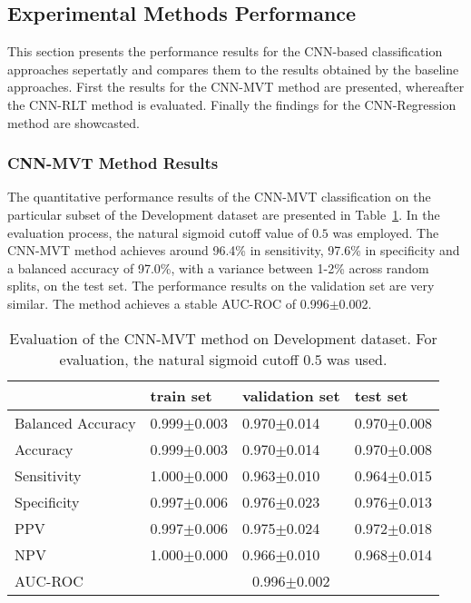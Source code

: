 \subsection{Experimental Methods Performance}
\label{subsec:exp_methods_perf}

This section presents the performance results for the CNN-based classification approaches sepertatly and compares them 
to the results obtained by the baseline approaches.
First the results for the CNN-MVT method are presented, whereafter the CNN-RLT method is evaluated.
Finally the findings for the CNN-Regression method are showcasted.

\subsubsection{CNN-MVT Method Results}
\label{subsubsec:eval_mvt}



The quantitative performance results of the CNN-MVT classification on the 
particular subset of the Development dataset are presented in Table~\ref{t1:cnn_mvt_perf_eval_table}.
In the evaluation process, the natural sigmoid cutoff value of $0.5$ was employed.
The CNN-MVT method achieves around 96.4\% in sensitivity, 97.6\% in specificity and a balanced accuracy of 97.0\%, 
with a variance between 1-2\% across random splits, on the test set.
The performance results on the validation set are very similar.
The method achieves a stable AUC-ROC of 0.996$\pm$0.002.


\begin{table}[ht]
  \caption{Evaluation of the CNN-MVT method on Development dataset. 
  For evaluation, the natural sigmoid cutoff $0.5$ was used.}
  \centering
  \begin{tabular}{llll}
      \hline
                        & train set         & validation set      & test set             \\
      \hline
      Balanced Accuracy & 0.999$\pm$0.003   &  0.970$\pm$0.014    &  0.970$\pm$0.008   \\
      Accuracy          & 0.999$\pm$0.003    &   0.970$\pm$0.014   &  0.970$\pm$0.008   \\
      Sensitivity       &  1.000$\pm$0.000   &   0.963$\pm$0.010   &  0.964$\pm$0.015  \\
      Specificity       &   0.997$\pm$0.006   &   0.976$\pm$0.023  &   0.976$\pm$0.013  \\
      PPV               &  0.997$\pm$0.006   &   0.975$\pm$0.024   &  0.972$\pm$0.018 \\
      NPV               &  1.000$\pm$0.000    &   0.966$\pm$0.010   & 0.968$\pm$0.014  \\
      \hline
      AUC-ROC          &  \multicolumn{3}{c}{0.996$\pm$0.002}  \\
      \hline
  \end{tabular}
 \label{t1:cnn_mvt_perf_eval_table}
\end{table}


